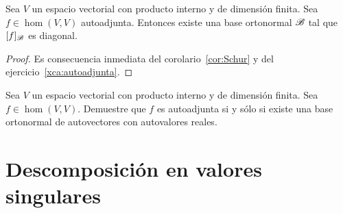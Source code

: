 \begin{thm}
	Sea $V$ un espacio vectorial con producto interno y de dimensión finita.
	Sea $f\in\hom(V,V)$ autoadjunta. Entonces existe una base ortonormal $\mathscr{B}$
	tal que $[f]_{\mathscr{B}}$ es diagonal.

	\begin{proof}
        Es consecuencia inmediata del corolario~\ref{cor:Schur} y del
        ejercicio~\ref{xca:autoadjunta}.
	\end{proof}
\end{thm}

\begin{xca}
	Sea $V$ un espacio vectorial con producto interno y de dimensión finita.
	Sea $f\in\hom(V,V)$. Demuestre que $f$ es autoadjunta si y sólo si existe
	una base ortonormal de autovectores con autovalores reales.
\end{xca}

\section{Descomposición en valores singulares}


